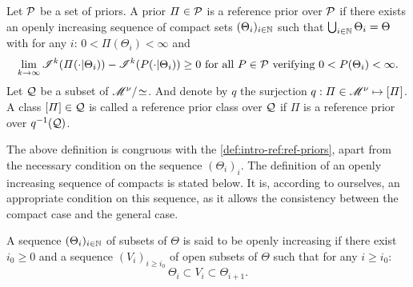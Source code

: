 \begin{defi}
    Let $\mathcal{P}$ be a set of priors. A prior $\varPi\in\mathcal{P}$ is a reference prior over $\mathcal{P}$ if there exists an openly increasing sequence of compact sets $(\Theta_i)_{i\in\mathbb{N}}$ such that $\bigcup_{i\in\mathbb{N}}\Theta_i=\Theta$ with for any $i$: $0<\varPi(\Theta_i)<\infty$ and
    \begin{equation}
        \lim_{k\rightarrow\infty}\sI^k(\varPi(\cdot|\Theta_i)) - \sI^k(P(\cdot|\Theta_i))  \geq 0 \text{\ for all\ } P\in\cP\text{\ verifying\ }0<P(\Theta_i)<\infty.
    \end{equation}
    Let $\mathcal{Q}$ be a subset of $\mathscr{M}^\nu/\!\simeq$.
    And denote by $q$ the surjection $q:\varPi\in\mathscr{M}^\nu\mapsto[\varPi]$.  
    A class $[\varPi]\in\mathcal{Q}$ is called a reference prior class over $\mathcal{Q}$ if $\varPi$ is a reference prior over $q^{-1}(\mathcal{Q})$.
\end{defi}



The above definition is congruous with the \cref{def:intro-ref:ref-priors}, apart from the necessary condition on the sequence $(\Theta_i)_i$. 
The definition of an openly increasing sequence of compacts
is stated below. It is, according to ourselves, an appropriate condition on this sequence, as it allows the consistency between the compact case and the general case.


\begin{defi}
    A sequence $(\Theta_i)_{i\in \mathbb{N}}$ of subsets of $\Theta$ is said to be openly increasing if there exist $i_0\geq0$ and a sequence $(V_i)_{i\geq i_0}$ of open subsets of $\Theta$ such that for any $i\geq i_0$:
    \begin{equation}
        \Theta_i\subset V_i\subset\Theta_{i+1}.
    \end{equation}
\end{defi}




